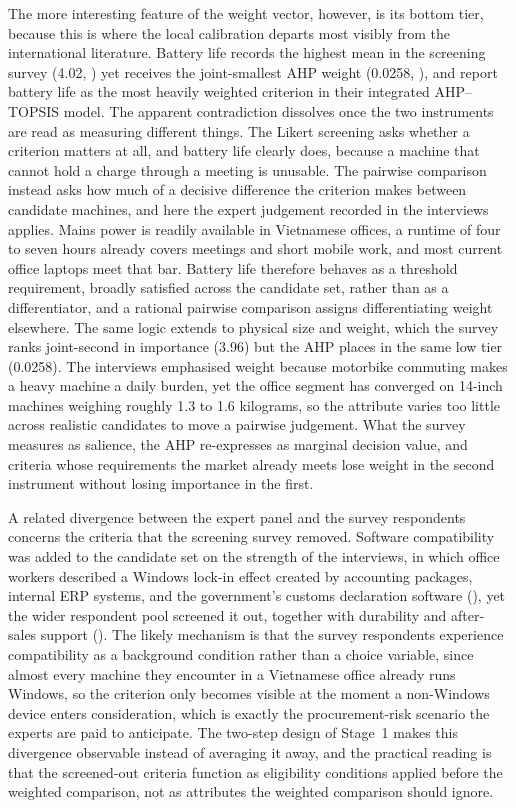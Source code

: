 The more interesting feature of the weight vector, however, is its bottom tier, because
this is where the local calibration departs most visibly from the international
literature. Battery life records the highest mean in the screening survey (4.02,
) yet receives the joint-smallest AHP weight (0.0258,
), and \textcite{weng_siew_lam_evaluation_2023} report battery life as
the most heavily weighted criterion in their integrated AHP--TOPSIS model. The apparent
contradiction dissolves once the two instruments are read as measuring different things.
The Likert screening asks whether a criterion matters at all, and battery life clearly
does, because a machine that cannot hold a charge through a meeting is unusable. The pairwise
comparison instead asks how much of a decisive difference the criterion makes between
candidate machines, and here the expert judgement recorded in the interviews applies. Mains
power is readily available in Vietnamese offices, a runtime of four to seven hours
already covers meetings and short mobile work, and most current office laptops meet that
bar. Battery life therefore behaves as a threshold requirement, broadly satisfied across
the candidate set, rather than as a differentiator, and a rational pairwise comparison
assigns differentiating weight elsewhere. The same logic extends to physical size and
weight, which the survey ranks joint-second in importance (3.96) but the AHP places in the
same low tier (0.0258). The interviews emphasised weight because motorbike commuting makes
a heavy machine a daily burden, yet the office segment has converged on 14-inch machines
weighing roughly 1.3 to 1.6 kilograms, so the attribute varies too little across realistic
candidates to move a pairwise judgement. What the survey measures as salience, the AHP
re-expresses as marginal decision value, and criteria whose requirements the market
already meets lose weight in the second instrument without losing importance in the first.

A related divergence between the expert panel and the survey respondents concerns the
criteria that the screening survey removed. Software compatibility was added to the candidate set
on the strength of the interviews, in which office workers described a Windows lock-in
effect created by accounting packages, internal ERP systems, and the government's customs
declaration software (), yet the wider respondent pool
screened it out, together with durability and after-sales support
(). The likely mechanism is that the survey respondents experience
compatibility as a background condition rather than a choice variable, since almost every
machine they encounter in a Vietnamese office already runs Windows, so the criterion only
becomes visible at the moment a non-Windows device enters consideration, which is exactly
the procurement-risk scenario the experts are paid to anticipate. The two-step design of Stage~1 makes this
divergence observable instead of averaging it away, and the practical reading is that the
screened-out criteria function as eligibility conditions applied before the weighted
comparison, not as attributes the weighted comparison should ignore.

